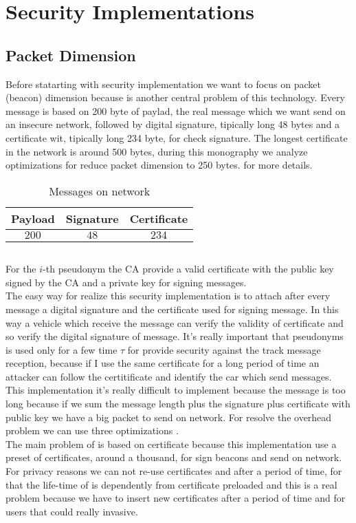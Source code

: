 \section{Security Implementations}
\subsection{Packet Dimension}\label{sec:PacketDimension}
Before statarting with security implementation we want to focus on packet (beacon) dimension because is another central problem of this technology. Every message is based on 200 byte of paylad, the real message which we want send on an insecure network, followed by digital signature, tipically long 48 bytes and a certificate wit, tipically long 234 byte, for check signature. The longest certificate in the network is around 500 bytes, during this monography we analyze optimizations for reduce packet dimension to 250 bytes.
\pageref{tab:CryptographyOverhead} for more details.
\begin{table}[!ht]
	\centering
	\caption{Messages on network}
	\begin{tabular}{|c|c|c|}
	\hline\hline 
	\textbf{Payload} & \textbf{Signature} & \textbf{Certificate}\\
	\hline
	$200$ &	$48$ & $234$\\
	\hline
	\hline     %
 	\end{tabular} 
	\label{tab:MessagesOnNetwork}
\end{table}
\subsection{\baseline}
For the $i$-th pseudonym the CA provide a valid certificate with the public key signed by the CA and a private key for signing messages.\\
The easy way for realize this security implementation is to attach after every message a digital signature and the certificate used for signing message. In this way a vehicle which receive the message can verify the validity of certificate and so verify the digital signature of message. It's really important that pseudonyms is used only for a few time $\tau$ for provide security against the track message reception, because if I use the same certificate for a long period of time an attacker can follow the certitificate and identify the car which send messages. This implementation it's really difficult to implement because the message is too long because if we sum the message length plus the signature plus certificate with public key we have a big packet to send on network. For resolve the overhead problem we can use three optimizations \cite{calandriello}.\\
The main problem of \baseline is based on certificate because this implementation use a preset of certificates, around a thousand, for sign beacons and send on network. For privacy reasons we can not re-use certificates and after a period of time, for that the life-time of \baseline is dependently from certificate preloaded and this is a real problem because we have to insert new certificates after a period of time and for users that could really invasive.